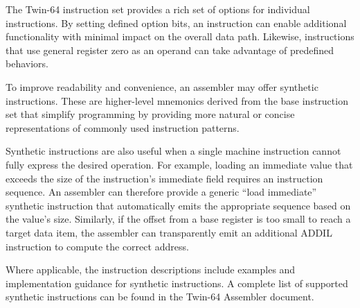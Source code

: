
The Twin-64 instruction set provides a rich set of options for individual instructions. By setting defined option bits, an instruction can enable additional functionality with minimal impact on the overall data path. Likewise, instructions that use general register zero as an operand can take advantage of predefined behaviors.

To improve readability and convenience, an assembler may offer synthetic instructions. These are higher-level mnemonics derived from the base instruction set that simplify programming by providing more natural or concise representations of commonly used instruction patterns.

Synthetic instructions are also useful when a single machine instruction cannot fully express the desired operation. For example, loading an immediate value that exceeds the size of the instruction’s immediate field requires an instruction sequence. An assembler can therefore provide a generic “load immediate” synthetic instruction that automatically emits the appropriate sequence based on the value’s size. Similarly, if the offset from a base register is too small to reach a target data item, the assembler can transparently emit an additional ADDIL instruction to compute the correct address.

Where applicable, the instruction descriptions include examples and implementation guidance for synthetic instructions. A complete list of supported synthetic instructions can be found in the Twin-64 Assembler document.

